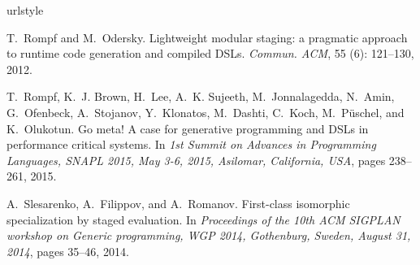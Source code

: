 \documentclass{sigplanconf}
\begin{document}




%

\begin{thebibliography}{3}
\softraggedright
\providecommand{\natexlab}[1]{#1}
\providecommand{\url}[1]{\texttt{#1}}
\expandafter\ifx\csname urlstyle\endcsname\relax
  \providecommand{\doi}[1]{doi: #1}\else
  \providecommand{\doi}{doi: \begingroup \urlstyle{rm}\Url}\fi

T.~Rompf and M.~Odersky.
\newblock Lightweight modular staging: a pragmatic approach to runtime code
  generation and compiled {DSLs}.
\newblock \emph{Commun. {ACM}}, 55 (6): 121--130, 2012.

T.~Rompf, K.~J. Brown, H.~Lee, A.~K. Sujeeth, M.~Jonnalagedda, N.~Amin,
  G.~Ofenbeck, A.~Stojanov, Y.~Klonatos, M.~Dashti, C.~Koch, M.~P{\"{u}}schel,
  and K.~Olukotun.
\newblock Go meta! {A} case for generative programming and {DSLs} in
  performance critical systems.
\newblock In \emph{1st Summit on Advances in Programming Languages, {SNAPL}
  2015, May 3-6, 2015, Asilomar, California, {USA}}, pages 238--261, 2015.

A.~Slesarenko, A.~Filippov, and A.~Romanov.
\newblock First-class isomorphic specialization by staged evaluation.
\newblock In \emph{Proceedings of the 10th {ACM} {SIGPLAN} workshop on Generic
  programming, {WGP} 2014, Gothenburg, Sweden, August 31, 2014}, pages 35--46,
  2014.

\end{thebibliography}
\end{document}
